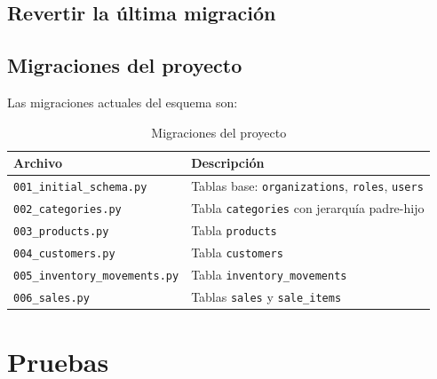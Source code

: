 \subsection{Revertir la última migración}\label{revertir-la-uxfaltima-migraciuxf3n}

\begin{Shaded}
\begin{Highlighting}[]
\end{Highlighting}
\end{Shaded}

\subsection{Migraciones del proyecto}\label{migraciones-del-proyecto}

Las migraciones actuales del esquema son:

\begin{longtable}[]{@{}
  >{\raggedright\arraybackslash}p{}
  >{\raggedright\arraybackslash}p{}@{}}
\caption[Migraciones del proyecto]{Migraciones del proyecto}\tabularnewline
\toprule\noalign{}
\begin{minipage}[b]{\linewidth}\raggedright
Archivo
\end{minipage} & \begin{minipage}[b]{\linewidth}\raggedright
Descripción
\end{minipage} \\
\midrule\noalign{}
\endhead
\bottomrule\noalign{}
\endlastfoot
\texttt{001\_initial\_schema.py} & Tablas base: \texttt{organizations}, \texttt{roles}, \texttt{users} \\
\texttt{002\_categories.py} & Tabla \texttt{categories} con jerarquía padre-hijo \\
\texttt{003\_products.py} & Tabla \texttt{products} \\
\texttt{004\_customers.py} & Tabla \texttt{customers} \\
\texttt{005\_inventory\_movements.py} & Tabla \texttt{inventory\_movements} \\
\texttt{006\_sales.py} & Tablas \texttt{sales} y \texttt{sale\_items} \\
\end{longtable}

\section{Pruebas}\label{pruebas}

